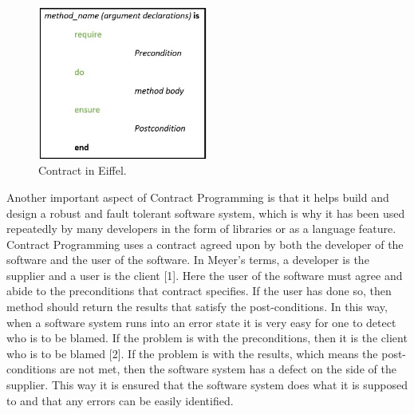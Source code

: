 \begin{figure}[htb]
\centering
\includegraphics[width=0.5\textwidth]{images/EiffelContract.jpg}
\caption{Contract in Eiffel.} 
\label{fig:EiffelContract}
\end{figure}

Another important aspect of Contract Programming is that it helps build and design a robust and fault tolerant software system, which is why it has been used repeatedly by many developers in the form of libraries or as a language feature.
Contract Programming uses a contract agreed upon by both the developer of the software and the user of the software. In Meyer’s terms, a developer is the supplier and a user is the client [1].  
Here the user of the software must agree and abide to the preconditions that contract specifies. If the user has done so, then method should return the results that satisfy the post-conditions. In this way, when a software system runs into an error state it is very easy for one to detect who is to be blamed. If the problem is with the preconditions, then it is the client who is to be blamed [2]. If the problem is with the results, which means the post-conditions are not met, then the software system has a defect on the side of the supplier. This way it is ensured that the software system does what it is supposed to and that any errors can be easily identified.

